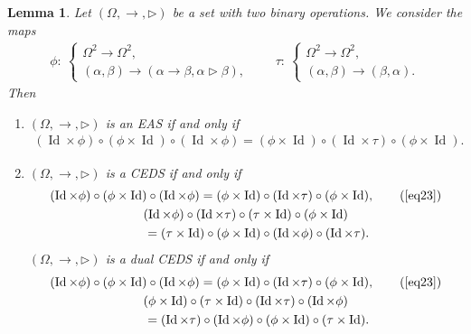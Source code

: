 \documentclass[pdftex]{sigma}
\numberwithin{equation}{section}
\newtheorem{Lemma}[Theorem]{Lemma}
\begin{document}
\begin{Lemma}\label{lem2.6}
Let $(\Omega,\rightarrow,\triangleright)$ be a set with two binary operations. We consider the maps
\begin{align*}
\phi\colon\ \begin{cases}
\Omega^2 \longrightarrow \Omega^2,\\
(\alpha,\beta) \longrightarrow (\alpha \rightarrow \beta,\alpha \triangleright \beta),
\end{cases} \qquad
\tau\colon\ \begin{cases}
\Omega^2 \longrightarrow \Omega^2,\\
(\alpha,\beta) \longrightarrow (\beta,\alpha).
\end{cases}
\end{align*}
Then
\begin{enumerate}\itemsep=0pt
\item[$(1)$] $(\Omega,\rightarrow,\triangleright)$ is an EAS if and only if
\begin{align}
\label{eq23}(\operatorname{Id} \times \phi)\circ (\phi\times \operatorname{Id})\circ (\operatorname{Id} \times \phi) =(\phi \times \operatorname{Id})\circ (\operatorname{Id} \times \tau)\circ (\phi\times \operatorname{Id}).
\end{align}
\item[$(2)$] $(\Omega,\rightarrow,\triangleright)$ is a CEDS if and only if
\begin{gather}
(\operatorname{Id} \times \phi)\circ (\phi\times \operatorname{Id})\circ (\operatorname{Id} \times \phi) =(\phi \times \operatorname{Id})\circ (\operatorname{Id} \times \tau)\circ (\phi\times \operatorname{Id}),\tag{\ref{eq23}}\\
(\operatorname{Id} \times \phi)\circ (\operatorname{Id} \times \tau) \circ (\tau \times \operatorname{Id})\circ (\phi \times \operatorname{Id})\nonumber\\
\qquad =(\tau \times \operatorname{Id})\circ (\phi \times \operatorname{Id})\circ (\operatorname{Id} \times \phi)\circ (\operatorname{Id} \times \tau).\label{eq24}
\end{gather}
$(\Omega,\rightarrow,\triangleright)$ is a dual CEDS if and only if
\begin{gather}
(\operatorname{Id} \times \phi)\circ (\phi\times \operatorname{Id})\circ (\operatorname{Id} \times \phi) =(\phi \times \operatorname{Id})\circ (\operatorname{Id} \times \tau)\circ (\phi\times \operatorname{Id}),\tag{\ref{eq23}}\\
(\phi \times \operatorname{Id})\circ (\tau \times \operatorname{Id})\circ (\operatorname{Id} \times \tau)\circ (\operatorname{Id} \times \phi) \nonumber\\
\qquad=(\operatorname{Id} \times \tau)\circ (\operatorname{Id} \times \phi)\circ (\phi \times \operatorname{Id})\circ (\tau \times \operatorname{Id}).\label{eq25}
\end{gather}\end{enumerate}\end{Lemma}
\end{document}

